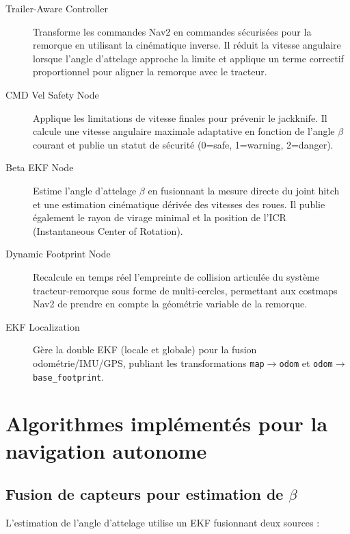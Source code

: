 \documentclass[a4paper,12pt]{report}
\begin{document}
\begin{description}
    \item[Trailer-Aware Controller] Transforme les commandes Nav2 en commandes sécurisées pour la remorque en utilisant la cinématique inverse. Il réduit la vitesse angulaire lorsque l'angle d'attelage approche la limite et applique un terme correctif proportionnel pour aligner la remorque avec le tracteur.
    
    \item[CMD Vel Safety Node] Applique les limitations de vitesse finales pour prévenir le jackknife. Il calcule une vitesse angulaire maximale adaptative en fonction de l'angle $\beta$ courant et publie un statut de sécurité (0=safe, 1=warning, 2=danger).
    
    \item[Beta EKF Node] Estime l'angle d'attelage $\beta$ en fusionnant la mesure directe du joint hitch et une estimation cinématique dérivée des vitesses des roues. Il publie également le rayon de virage minimal et la position de l'ICR (Instantaneous Center of Rotation).
    
    \item[Dynamic Footprint Node] Recalcule en temps réel l'empreinte de collision articulée du système tracteur-remorque sous forme de multi-cercles, permettant aux costmaps Nav2 de prendre en compte la géométrie variable de la remorque.
    
    \item[EKF Localization] Gère la double EKF (locale et globale) pour la fusion odométrie/IMU/GPS, publiant les transformations \texttt{map$\to$odom} et \texttt{odom$\to$base\_footprint}.
\end{description}

\section{Algorithmes implémentés pour la navigation autonome}
\label{sec:algorithmes_navigation}

\subsection{Fusion de capteurs pour estimation de $\beta$}
\label{subsec:fusion_beta}

L'estimation de l'angle d'attelage utilise un EKF fusionnant deux sources :
\end{document}
